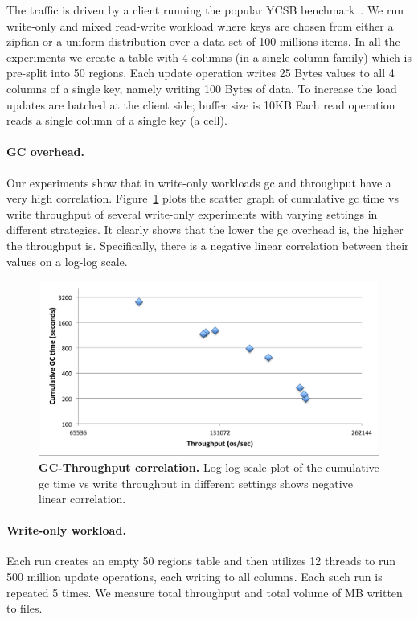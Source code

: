 The traffic is driven by a client running the popular YCSB benchmark~\cite{Cooper}. 
We run write-only and mixed read-write workload where keys are chosen from either a zipfian or a uniform distribution over a data set of 100 millions items.
In all the experiments we create a table with 4 columns (in a single column family) which is pre-split into 50 regions. 
Each update operation writes 25 Bytes values to all 4 columns of a single key, namely writing 100 Bytes of data. To increase the load updates are batched at the client side; buffer size is 10KB
Each read operation reads a single column of a single key (a cell).


\paragraph{GC overhead.}

Our experiments show that in write-only workloads gc and throughput have a very high correlation. 
Figure~\ref{fig:gc-throughput-log2} plots the scatter graph of cumulative gc time vs write throughput of several write-only experiments with varying settings in different strategies. It clearly shows that  the lower the gc overhead is, the higher the throughput is.
Specifically, there is a negative linear correlation between their values on a log-log scale.

\begin{figure}[htb]
\includegraphics[width=\figw]{Figs/gc-throughput-log2.png}
\caption{{\bf GC-Throughput correlation.} Log-log scale plot of the cumulative gc time vs write throughput in different settings shows negative linear correlation.
}
\label{fig:gc-throughput-log2}
\end{figure}


\paragraph{Write-only workload.}
Each run creates an empty 50 regions table and then utilizes 12 threads to run 500 million update operations, each writing to all columns. Each such run is repeated 5 times. 
We measure total  throughput and total volume of MB written to files.

